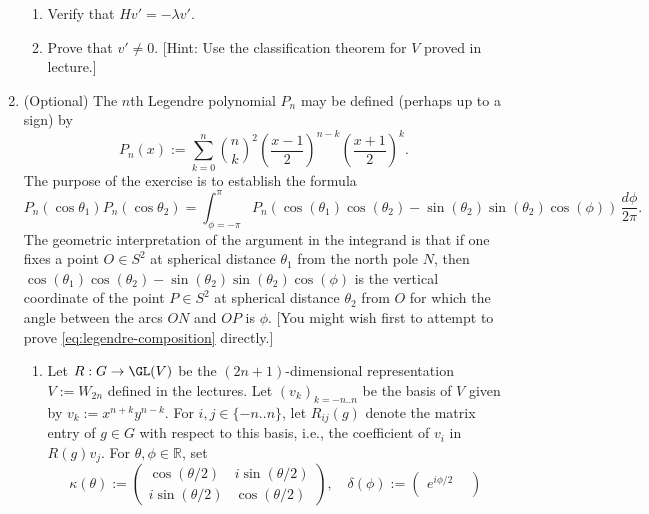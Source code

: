 \documentclass[reqno]{amsart} 
\begin{document}
\begin{homework}
\begin{enumerate}
    \begin{enumerate}
    \item Verify that $H v' = - \lambda v'$.
    \item Prove that $v' \neq 0$.  [Hint: Use the classification theorem for $V$ proved in lecture.]
    \end{enumerate}
  \item (Optional) The $n$th Legendre polynomial $P_n$ may be defined (perhaps up to a sign) by
    \begin{equation*}
      P_n(x) := \sum_{k=0}^n {\binom{n}{k}}^2 \left( \frac{x-1}{2} \right)^{n-k} \left( \frac{x+1}{2} \right)^{k}.
    \end{equation*}
    The purpose of the exercise is to establish the formula
    \begin{equation}\label{eq:legendre-composition}
      P_n(\cos \theta_1) P_n(\cos \theta_2)
      = \int_{\phi = -\pi}^{\pi}
      P_n(\cos(\theta_1) \cos(\theta_2) - \sin(\theta_2)
      \sin(\theta_2) \cos(\phi))
      \,
      \frac{d \phi }{2 \pi }.
    \end{equation}
    The geometric interpretation of the argument in the integrand is that if one fixes a point $O \in S^2$ at spherical distance $\theta_1$ from the north pole $N$, then $\cos(\theta_1) \cos(\theta_2) - \sin(\theta_2) \sin(\theta_2) \cos(\phi)$ is the vertical coordinate of the point $P \in S^2$ at spherical distance $\theta_2$ from $O$ for which the angle between the arcs $O N$ and $O P$ is $\phi$.  [You might wish first to attempt to prove \eqref{eq:legendre-composition} directly.]
    \begin{enumerate}
    \item Let $R : G \rightarrow \GL(V)$ be the $(2 n+1)$-dimensional representation $V := W_{2 n}$ defined in the lectures.  Let $(v_k)_{k=-n..n}$ be the basis of $V$ given by $v_k := x^{n+k} y^{n-k}$.  For $i,j \in \{-n..n\}$, let $R_{i j}(g)$ denote the matrix entry of $g \in G$ with respect to this basis, i.e., the coefficient of $v_i$ in $R(g) v_j$.  For $\theta,\phi \in \mathbb{R}$, set
      \begin{equation*}
        \kappa(\theta) := 
\begin{pmatrix}
          \cos (\theta/2)  & i\sin (\theta/2)  \\
          i\sin (\theta/2) & \cos (\theta /2)
        \end{pmatrix}
,
        \quad
        \delta(\phi) :=
        \begin{pmatrix}
          e^{i \phi/2}  &  \\

\end{pmatrix}
\end{equation*}
\end{enumerate}
\end{enumerate}
\end{homework}
\end{document}
